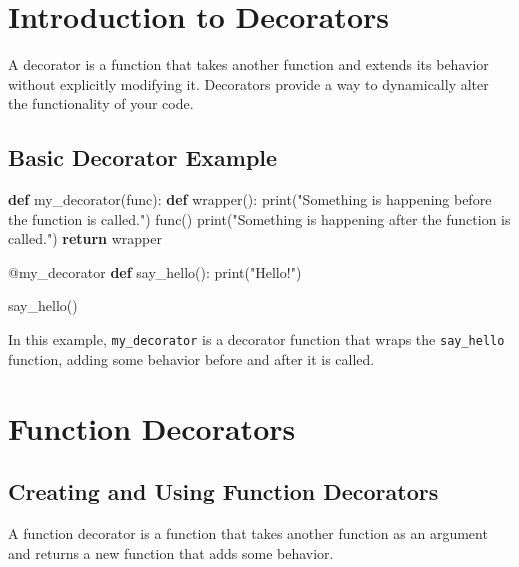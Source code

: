 \documentclass[
  letterpaper,
  DIV=11,
  numbers=noendperiod]{scrreprt}
\newenvironment{Shaded}{\begin{snugshade}}{\end{snugshade}}
\newcommand{\AttributeTok}[1]{\textcolor[rgb]{0.40,0.45,0.13}{#1}}
\newcommand{\BuiltInTok}[1]{\textcolor[rgb]{0.00,0.23,0.31}{#1}}
\newcommand{\ControlFlowTok}[1]{\textcolor[rgb]{0.00,0.23,0.31}{\textbf{#1}}}
\newcommand{\KeywordTok}[1]{\textcolor[rgb]{0.00,0.23,0.31}{\textbf{#1}}}
\newcommand{\NormalTok}[1]{\textcolor[rgb]{0.00,0.23,0.31}{#1}}
\newcommand{\StringTok}[1]{\textcolor[rgb]{0.13,0.47,0.30}{#1}}
\begin{document}
\section{Introduction to Decorators}\label{introduction-to-decorators}

A decorator is a function that takes another function and extends its
behavior without explicitly modifying it. Decorators provide a way to
dynamically alter the functionality of your code.

\subsection{Basic Decorator Example}\label{basic-decorator-example}

\begin{Shaded}
\begin{Highlighting}[]
\KeywordTok{def}\NormalTok{ my\_decorator(func):}
    \KeywordTok{def}\NormalTok{ wrapper():}
        \BuiltInTok{print}\NormalTok{(}\StringTok{"Something is happening before the function is called."}\NormalTok{)}
\NormalTok{        func()}
        \BuiltInTok{print}\NormalTok{(}\StringTok{"Something is happening after the function is called."}\NormalTok{)}
    \ControlFlowTok{return}\NormalTok{ wrapper}

\AttributeTok{@my\_decorator}
\KeywordTok{def}\NormalTok{ say\_hello():}
    \BuiltInTok{print}\NormalTok{(}\StringTok{"Hello!"}\NormalTok{)}

\NormalTok{say\_hello()}
\end{Highlighting}
\end{Shaded}

In this example, \texttt{my\_decorator} is a decorator function that
wraps the \texttt{say\_hello} function, adding some behavior before and
after it is called.

\section{Function Decorators}\label{function-decorators}

\subsection{Creating and Using Function
Decorators}\label{creating-and-using-function-decorators}

A function decorator is a function that takes another function as an
argument and returns a new function that adds some behavior.
\end{document}
